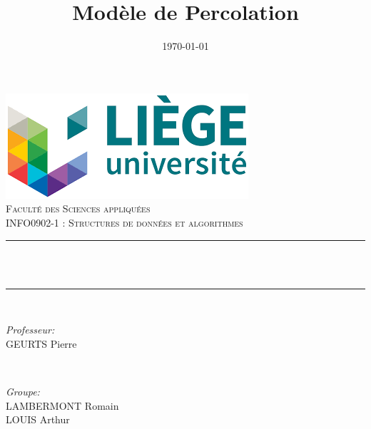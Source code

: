 \documentclass[12pt]{article}
\title{Modèle de Percolation}								%
\date{\today}											%
\makeatletter
\let\thetitle\@title
\let\thedate\@date
\makeatother
\begin{document}

\begin{titlepage}
	\centering
    \includegraphics[scale = 0.7]{University.png}\\[1.0 cm]	%
    \textsc{\LARGE \newline\newline Faculté des Sciences appliquées}\\	%
	\textsc{\Large  INFO0902-1 : Structures de données et algorithmes}\\[0.5 cm]				%
	\rule{\linewidth}{0.2 mm} \\[0.4 cm]
	{ \huge \bfseries \thetitle}\\
	\rule{\linewidth}{0.2 mm} \\[2 cm]
	
	\begin{minipage}{0.5\textwidth}
		\begin{flushleft} \large
			\emph{Professeur:}\\
			GEURTS Pierre\\
			\end{flushleft}
			\end{minipage}~
			\begin{minipage}{0.4\textwidth}
            
			\begin{flushright} \large
			\emph{Groupe:} \\
			LAMBERMONT Romain\\
            LOUIS Arthur\\
		\end{flushright}
        
	\end{minipage}\\[5 cm]
	
	
    \thedate
    
    
    
	
\end{titlepage}

\thispagestyle{empty}
\tableofcontents
\pagebreak
\setcounter{page}{1}
\end{document}
